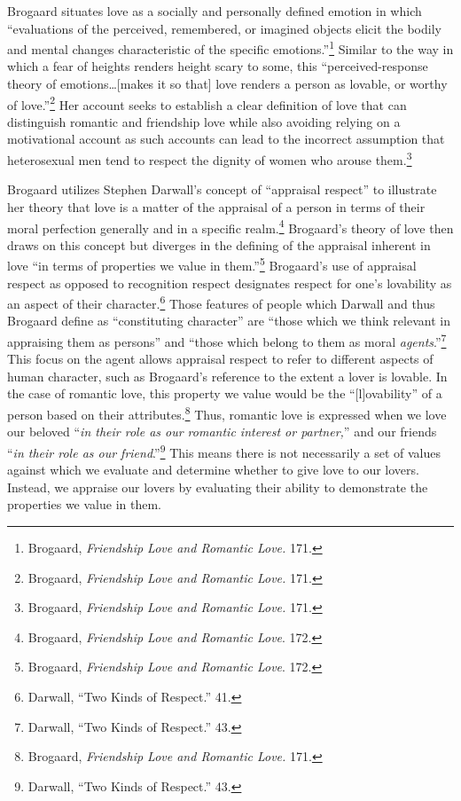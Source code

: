 Brogaard situates love as a socially and personally defined emotion in
which ``evaluations of the perceived, remembered, or imagined objects
elicit the bodily and mental changes characteristic of the specific
emotions.''\footnote{Brogaard, \emph{Friendship Love and Romantic Love.}
  171.} Similar to the way in which a fear of heights renders height
scary to some, this ``perceived-response theory of emotions\ldots [makes
it so that] love renders a person as lovable, or worthy of
love.''\footnote{Brogaard, \emph{Friendship Love and Romantic Love.}
  171.} Her account seeks to establish a clear
definition of love that can distinguish romantic and friendship love
while also avoiding relying on a motivational account as such accounts
can lead to the incorrect assumption that heterosexual men tend to
respect the dignity of women who arouse them.\footnote{Brogaard, \emph{Friendship Love and Romantic Love.} 171.}

Brogaard utilizes Stephen Darwall's concept of ``appraisal respect'' to
illustrate her theory that love is a matter of the appraisal of a person
in terms of their moral perfection generally and in a specific
realm.\footnote{Brogaard, \emph{Friendship Love and Romantic Love}. 172.}
Brogaard's theory of love then draws on this concept but diverges in the
defining of the appraisal inherent in love ``in terms of properties we
value in them.''\footnote{Brogaard, \emph{Friendship Love and Romantic Love}. 172.} Brogaard's use of appraisal respect as
opposed to recognition respect designates respect for one's lovability
as an aspect of their character.\footnote{Darwall, ``Two Kinds of
  Respect.'' 41.} Those features of people which Darwall and thus
Brogaard define as ``constituting character'' are ``those which we think
relevant in appraising them as persons'' and ``those which belong to
them as moral \emph{agents}.''\footnote{Darwall, ``Two Kinds of
  Respect.'' 43.} This focus on the
agent allows appraisal respect to refer to different aspects of human
character, such as Brogaard's reference to the extent a lover is
lovable. In the case of romantic love, this property we value would be
the ``[l]ovability'' of a person based on their
attributes.\footnote{Brogaard, \emph{Friendship Love and Romantic Love.}
  171.} Thus, romantic love is expressed when we love our beloved
``\emph{in their role as our romantic interest or partner,}'' and our
friends ``\emph{in their role as our friend}.''\footnote{Darwall, ``Two
  Kinds of Respect.'' 43.} This means there is not necessarily a set of
values against which we evaluate and determine whether to give love to
our lovers. Instead, we appraise our lovers by evaluating their ability
to demonstrate the properties we value in them.

